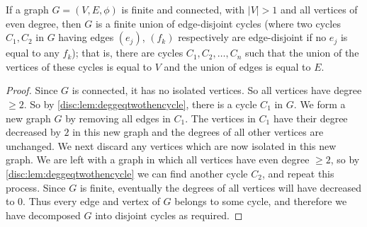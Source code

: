 \documentclass[10pt, a4paper]{article}
\begin{document}
\begin{lemma}\label{disc:lem:unionofdisjointcycles}
    If a graph $G = (V, E, \phi)$ is finite and connected,
    with $|V| > 1$ and all vertices of even degree,
    then $G$ is a finite union of edge-disjoint cycles
    (where two cycles $C_1, C_2$ in $G$ having edges $(e_j)$,
    $(f_k)$ respectively are edge-disjoint if no $e_j$ is equal to any $f_k$);
    that is,
    there are cycles $C_1, C_2, \dotsc, C_n$ such that the union of the vertices of these cycles is equal to $V$ and the union of edges is equal to $E$.
    
    \begin{proof}
        Since $G$ is connected,
        it has no isolated vertices.
        So all vertices have degree $\geq 2$.
        So by \autoref{disc:lem:deggeqtwothencycle},
        there is a cycle $C_1$ in $G$.
        We form a new graph $G$ by removing all edges in $C_1$.
        The vertices in $C_1$ have their degree decreased by $2$ in this new graph and the degrees of all other vertices are unchanged.
        We next discard any vertices which are now isolated in this new graph.
        We are left with a graph in which all vertices have even degree $\geq 2$,
        so by \autoref{disc:lem:deggeqtwothencycle} we can find another cycle $C_2$,
        and repeat this process.
        Since $G$ is finite,
        eventually the degrees of all vertices will have decreased to $0$.
        Thus every edge and vertex of $G$ belongs to some cycle,
        and therefore we have decomposed $G$ into disjoint cycles as required.
    \end{proof}
\end{lemma}
\end{document}
